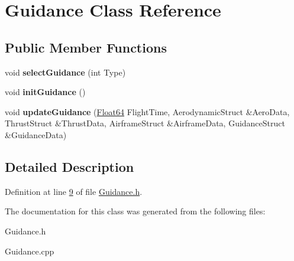 \hypertarget{class_guidance}{}\section{Guidance Class Reference}
\label{class_guidance}
\subsection*{Public Member Functions}
\begin{DoxyCompactItemize}
\item 
\mbox{\label{class_guidance_af38a54211f890c38b8dcc99f2f2d5f32}} 
void {\bfseries select\+Guidance} (int Type)
\item 
\mbox{\label{class_guidance_a61b58cfd7f8219ff4c8ad3429fb72bad}} 
void {\bfseries init\+Guidance} ()
\item 
\mbox{\label{class_guidance_a63f50ab91a4661b7d5d4927e6deb14ff}} 
void {\bfseries update\+Guidance} (\hyperlink{group___tools_ga3f1431cb9f76da10f59246d1d743dc2c}{Float64} Flight\+Time, Aerodynamic\+Struct \&Aero\+Data, Thrust\+Struct \&Thrust\+Data, Airframe\+Struct \&Airframe\+Data, Guidance\+Struct \&Guidance\+Data)
\end{DoxyCompactItemize}


\subsection{Detailed Description}


Definition at line \hyperlink{_guidance_8h_source_l00009}{9} of file \hyperlink{_guidance_8h_source}{Guidance.\+h}.



The documentation for this class was generated from the following files\+:\begin{DoxyCompactItemize}
\item 
Guidance.\+h\item 
Guidance.\+cpp\end{DoxyCompactItemize}

